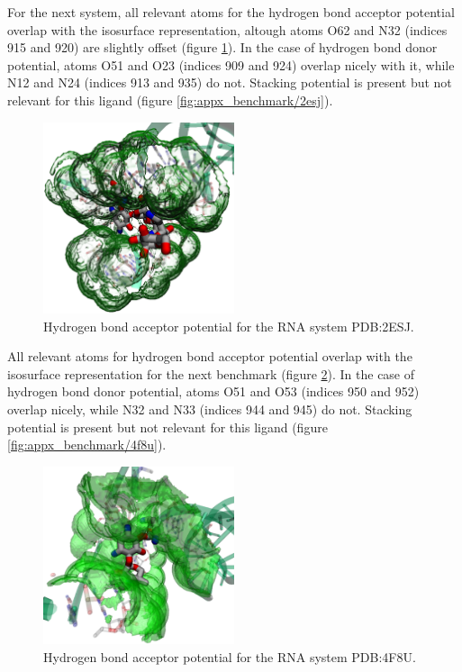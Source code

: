     For the next system, all relevant atoms for the hydrogen bond acceptor potential overlap with the isosurface representation, altough atoms O62 and N32 (indices 915 and 920) are slightly offset (figure \ref{fig:benchmark/2esj}). In the case of hydrogen bond donor potential, atoms O51 and O23 (indices 909 and 924) overlap nicely with it, while N12 and N24 (indices 913 and 935) do not. Stacking potential is present but not relevant for this ligand (figure \ref{fig:appx_benchmark/2esj}).

    \begin{figure}[H]
      \centering
      \includegraphics[width=0.5\textwidth]{figures/results/benchmark_rna/2esj.png}
      \caption{\label{fig:benchmark/2esj} Hydrogen bond acceptor potential for the RNA system PDB:2ESJ.}
    \end{figure}

    All relevant atoms for hydrogen bond acceptor potential overlap with the isosurface representation for the next benchmark (figure \ref{fig:benchmark/4f8u}). In the case of hydrogen bond donor potential, atoms O51 and O53 (indices 950 and 952) overlap nicely, while N32 and N33 (indices 944 and 945) do not. Stacking potential is present but not relevant for this ligand (figure \ref{fig:appx_benchmark/4f8u}).

    \begin{figure}[H]
      \centering
      \includegraphics[width=0.5\textwidth]{figures/results/benchmark_rna/4f8u.png}
      \caption{\label{fig:benchmark/4f8u} Hydrogen bond acceptor potential for the RNA system PDB:4F8U.}
    \end{figure}

